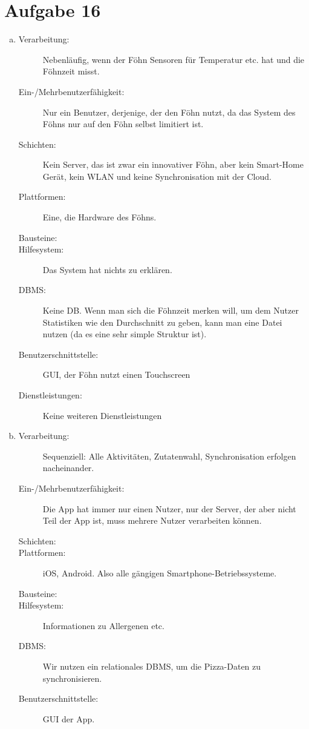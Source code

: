 \section*{Aufgabe 16}
\begin{enumerate} [a)]
	\item 
	\begin{description}
		\item[Verarbeitung:] Nebenläufig, wenn der Föhn Sensoren für Temperatur etc. hat und die Föhnzeit misst.
		\item[Ein-/Mehrbenutzerfähigkeit:] Nur ein Benutzer, derjenige, der den Föhn nutzt, da das System des Föhns nur auf den Föhn selbst limitiert ist.
		\item[Schichten:] Kein Server, das ist zwar ein innovativer Föhn, aber kein Smart-Home Gerät, kein WLAN und keine Synchronisation mit der Cloud.
		\item[Plattformen:] Eine, die Hardware des Föhns.
		\item[Bausteine:] 
		\item[Hilfesystem:] Das System hat nichts zu erklären.
		\item[DBMS:] Keine DB. Wenn man sich die Föhnzeit merken will, um dem Nutzer Statistiken wie den Durchschnitt zu geben, kann man eine Datei nutzen (da es eine sehr simple Struktur ist).
		\item[Benutzerschnittstelle:] GUI, der Föhn nutzt einen Touchscreen
		\item[Dienstleistungen:] Keine weiteren Dienstleistungen
	\end{description}
	\item 
		\begin{description}
		\item[Verarbeitung:] Sequenziell: Alle Aktivitäten, Zutatenwahl, Synchronisation erfolgen nacheinander.
		\item[Ein-/Mehrbenutzerfähigkeit:] Die App hat immer nur einen Nutzer, nur der Server, der aber nicht Teil der App ist, muss mehrere Nutzer verarbeiten können.
		\item[Schichten:]
		\item[Plattformen:] iOS, Android. Also alle gängigen Smartphone-Betriebssysteme.
		\item[Bausteine:]
		\item[Hilfesystem:] Informationen zu Allergenen etc.
		\item[DBMS:] Wir nutzen ein relationales DBMS, um die Pizza-Daten zu synchronisieren.
		\item [Benutzerschnittstelle:] GUI der App.

\end{description}
\end{enumerate}
